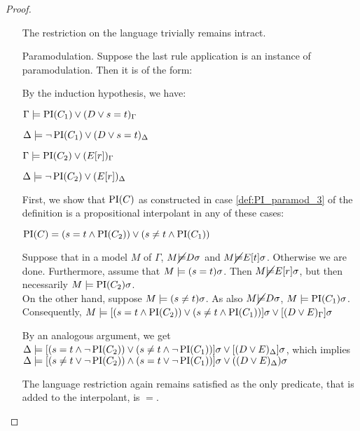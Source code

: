 \begin{proof}
\begin{itemize}
			The restriction on the language trivially remains intract.
			

		\item[Paramodulation.]	
			Suppose the last rule application is an instance of paramodulation. Then it is of the form:
			\begin{prooftree}
			\end{prooftree}

			By the induction hypothesis, we have:

			$\Gamma \models \operatorname{PI}(C_1) \lor (D\lor s=t)_\Gamma$

			$\Delta \models \lnot \operatorname{PI}(C_1) \lor (D\lor s=t)_\Delta$

			$\Gamma \models \operatorname{PI}(C_2) \lor (E[r])_\Gamma$

			$\Delta \models \lnot \operatorname{PI}(C_2) \lor (E[r])_\Delta$

			First, we show that $\operatorname{PI}(C)$ as constructed in case \ref{def:PI_paramod_3} of the definition is a propositional interpolant in any of these cases:

			$\operatorname{PI}(C) = (s=t \land \operatorname{PI}(C_2)) \lor (s\neq t \land \operatorname{PI}(C_1)) $
			
			Suppose that in a model $M$ of $\Gamma$, $M \cancel {\models} D\sigma$ and $M \cancel {\models} E[t]\sigma$. Otherwise we are done.
			Furthermore, assume that $M \models (s=t)\sigma$. Then $M \cancel {\models} E[r]\sigma$, but then necessarily $M \models \operatorname{PI}(C_2)\sigma$. \\
			On the other hand, suppose $M \models (s\neq t)\sigma$. As also $M \cancel {\models} D\sigma$, $M \models \operatorname{PI}(C_1)\sigma$.
			Consequently, $M \models [(s=t \land \operatorname{PI}(C_2)) \lor (s\neq t \land \operatorname{PI}(C_1))]\sigma \lor [(D \lor E)_\Gamma]\sigma$

			By an analogous argument, we get $\Delta \models [(s=t \land \lnot \operatorname{PI}(C_2)) \lor (s\neq t \land \lnot \operatorname{PI}(C_1))]\sigma \lor [(D \lor E)_\Delta]\sigma$,
			which implies
			$\Delta \models [( s\neq t \lor \lnot \operatorname{PI}(C_2)) \land (s = t \lor \lnot \operatorname{PI}(C_1))]\sigma \lor ((D \lor E)_\Delta)\sigma $


			The language restriction again remains satisfied as the only predicate, that is added to the interpolant, is $=$.


\end{itemize}
\end{proof}
